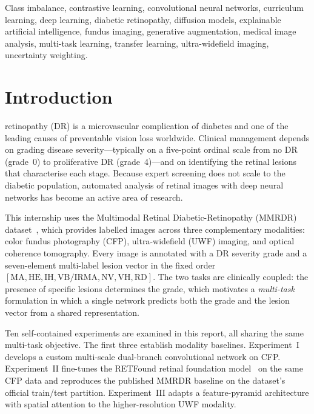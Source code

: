 \documentclass[journal,twoside,web]{ieeecolor}
\begin{document}
\begin{IEEEkeywords}
Class imbalance, contrastive learning, convolutional neural networks, curriculum
learning, deep learning, diabetic retinopathy, diffusion models, explainable
artificial intelligence, fundus imaging, generative augmentation, medical image
analysis, multi-task learning, transfer learning, ultra-widefield imaging,
uncertainty weighting.
\end{IEEEkeywords}

\section{Introduction}
\label{sec:introduction}
 retinopathy (DR) is a microvascular complication of
diabetes and one of the leading causes of preventable vision loss worldwide.
Clinical management depends on grading disease severity---typically on a
five-point ordinal scale from no DR (grade~0) to proliferative DR
(grade~4)---and on identifying the retinal lesions that characterise each stage.
Because expert screening does not scale to the diabetic population, automated
analysis of retinal images with deep neural networks has become an active area
of research.

This internship uses the Multimodal Retinal Diabetic-Retinopathy (MMRDR)
dataset~\cite{mmrdr}, which provides labelled images across three complementary
modalities: color fundus photography (CFP), ultra-widefield (UWF) imaging, and
optical coherence tomography. Every image is annotated with a DR severity grade
and a seven-element multi-label lesion vector in the fixed order
$[\text{MA},\text{HE},\text{IH},\text{VB/IRMA},\text{NV},\text{VH},\text{RD}]$.
The two tasks are clinically coupled: the presence of specific lesions
determines the grade, which motivates a \emph{multi-task} formulation in which a
single network predicts both the grade and the lesion vector from a shared
representation.

Ten self-contained experiments are examined in this report, all sharing the same
multi-task objective. The first three establish modality baselines. Experiment~I
develops a custom multi-scale dual-branch convolutional network on CFP.
Experiment~II fine-tunes the RETFound retinal foundation model~\cite{retfound} on
the same CFP data and reproduces the published MMRDR baseline on the dataset's
official train/test partition. Experiment~III adapts a feature-pyramid architecture
with spatial attention to the higher-resolution UWF modality.
\end{document}
